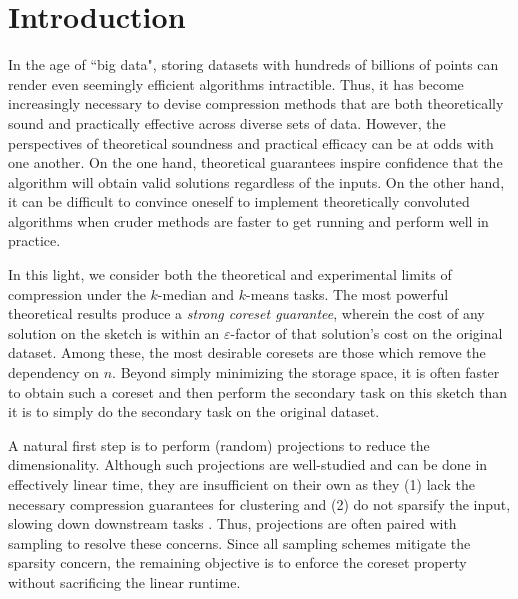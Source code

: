 \section{Introduction}

In the age of ``big data", storing datasets with hundreds of billions of points can render even seemingly efficient algorithms intractible. Thus, it has become
increasingly necessary to devise compression methods that are both theoretically sound and practically effective across diverse sets of data.
However, the perspectives of theoretical soundness and practical efficacy can be at odds with one another. On the one hand, theoretical
guarantees inspire confidence that the algorithm will obtain valid solutions regardless of the inputs. On the other hand, it can be difficult to convince
oneself to implement theoretically convoluted algorithms when cruder methods are faster to get running and perform well in practice.

In this light, we consider both the theoretical and experimental limits of compression under the $k$-median and $k$-means tasks. 
The most powerful theoretical results produce a \emph{strong coreset guarantee}, wherein the cost of any solution on the sketch  is within an
$\varepsilon$-factor of that solution's cost on the original dataset. Among these, the most desirable coresets are those which remove the dependency on $n$. 
Beyond simply minimizing the storage space, it is often faster to obtain such a coreset and then perform the secondary task on this sketch
than it is to simply do the secondary task on the original dataset.

A natural first step is to perform (random) projections to reduce the dimensionality. Although such projections are well-studied and can be done
in effectively linear time, they are insufficient on their own as they (1) lack the necessary compression guarantees for clustering 
and (2) do not
sparsify the input, slowing down downstream tasks . Thus, projections are often paired with sampling to resolve these concerns. Since all sampling schemes
mitigate the sparsity concern, the remaining objective is to enforce the coreset property without sacrificing the linear runtime.

